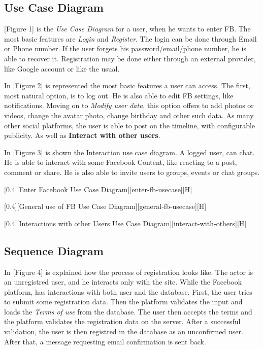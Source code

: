 \documentclass{article}
\begin{document}
		\subsection{Use Case Diagram}
			[Figure 1] is the \textit{Use Case Diagram} for a user, when he wants to enter FB. The most basic features are \textit{Login} and \textit{Register}. The login can be done through Email or Phone number. If the user forgets his password/email/phone number, he is able to recover it. Registration may be done either through an external provider, like Google account or like the usual.
			
			\bigskip
			In [Figure 2] is represented the most basic features a user can access. The first, most natural option, is to log out. He is also able to edit FB settings, like notifications. Moving on to \textit{Modify user data}, this option offers to add photos or videos, change the avatar photo, change birthday and other such data. As many other social platforms, the user is able to post on the timeline, with configurable publicity. As well as \textbf{Interact with other users}.

			\bigskip
			In [Figure 3] is shown the Interaction use case diagram. A logged user, can chat. He is able to interact with some Facebook Content, like reacting to a post, comment or share. He is also able to invite users to groups, events or chat groups.

			[0.4][Enter Facebook Use Case Diagram][enter-fb-usecase][H]

			[0.4][General use of FB Use Case Diagram][general-fb-usecase][H]

			[0.4][Interactions with other Users Use Case Diagram][interact-with-others][H]

		\subsection{Sequence Diagram}
			In [Figure 4] is explained how the process of registration looks like. The actor is an unregistred user, and he interacts only with the site. While the Facebook platform, has interactions with both user and the database. First, the user tries to submit some registration data. Then the platform validates the input and loads the \textit{Terms of use} from the database. The user then accepts the terms and the platform validates the registration data on the server. After a successful validation, the user is then registred in the database as an unconfirmed user. After that, a message requesting email confirmation is sent back.
\end{document}
